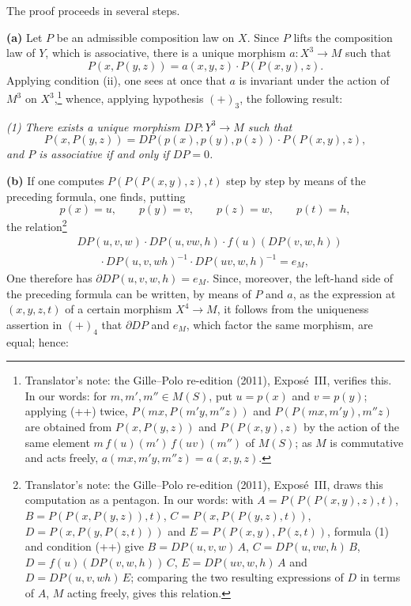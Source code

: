 The proof proceeds in several steps.

\smallskip
\noindent\textbf{(a)}
Let \(P\) be an admissible composition law on \(X\). Since \(P\)
lifts the composition law of \(Y\), which is associative, there is a unique
morphism \(a:X^3\to M\) such that
\[
 P(x,P(y,z))=a(x,y,z)\cdot P(P(x,y),z).
\]
Applying condition (ii), one sees at once that \(a\) is
invariant under the action of \(M^3\) on \(X^3\),\footnote{Translator's note: the Gille--Polo re-edition (2011), Exposé~III,
verifies this. In our words: for \(m,m',m''\in M(S)\), put \(u=p(x)\) and
\(v=p(y)\); applying (++) twice, \(P(mx,P(m'y,m''z))\) and
\(P(P(mx,m'y),m''z)\) are obtained from \(P(x,P(y,z))\) and
\(P(P(x,y),z)\) by the action of the same element
\(m\,f(u)(m')\,f(uv)(m'')\) of \(M(S)\); as \(M\) is commutative and acts
freely, \(a(mx,m'y,m''z)=a(x,y,z)\).} whence, applying hypothesis
\((+)_{3}\), the following result:

\smallskip
\noindent\textit{(1) There exists a unique morphism
\(DP:Y^3\to M\) such that}
\[
 P(x,P(y,z))=DP(p(x),p(y),p(z))\cdot P(P(x,y),z),
\]
\textit{and \(P\) is associative if and only if \(DP=0\).}

\smallskip
\noindent\textbf{(b)}
If one computes \(P(P(P(x,y),z),t)\) step by step by means of the preceding
formula, one finds, putting
\[
 p(x)=u,\qquad p(y)=v,\qquad p(z)=w,\qquad p(t)=h,
\]
the relation\footnote{Translator's note: the Gille--Polo re-edition (2011), Exposé~III,
draws this computation as a pentagon. In our words: with
\(A=P(P(P(x,y),z),t)\), \(B=P(P(x,P(y,z)),t)\), \(C=P(x,P(P(y,z),t))\),
\(D=P(x,P(y,P(z,t)))\) and \(E=P(P(x,y),P(z,t))\), formula (1) and
condition (++) give \(B=DP(u,v,w)\,A\), \(C=DP(u,vw,h)\,B\),
\(D=f(u)(DP(v,w,h))\,C\), \(E=DP(uv,w,h)\,A\) and \(D=DP(u,v,wh)\,E\);
comparing the two resulting expressions of \(D\) in terms of \(A\), \(M\)
acting freely, gives this relation.}
\[
\begin{aligned}
 &DP(u,v,w)\cdot DP(u,vw,h)\cdot f(u)(DP(v,w,h))\\
 &\qquad\cdot DP(u,v,wh)^{-1}\cdot DP(uv,w,h)^{-1}=e_M,
\end{aligned}
\]
One therefore has \(\partial DP(u,v,w,h)=e_M\). Since, moreover, the
left-hand side of the preceding formula can be written, by means of \(P\) and
\(a\), as the expression at \((x,y,z,t)\) of a certain morphism
\(X^4\to M\), it follows from the uniqueness assertion in \((+)_{4}\) that
\(\partial DP\) and \(e_M\), which factor the same morphism, are
equal; hence:

